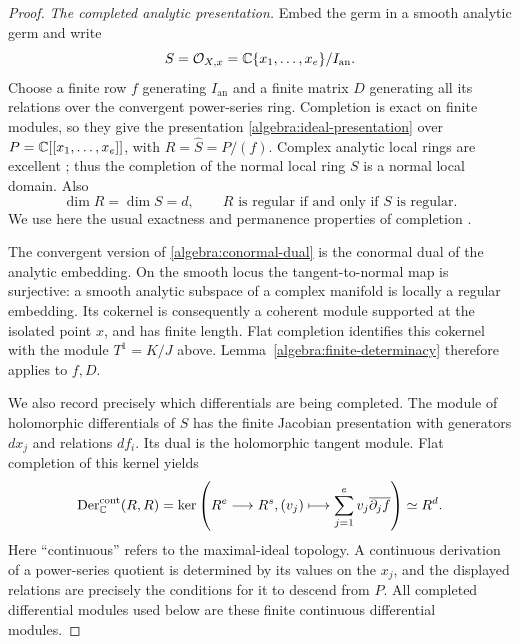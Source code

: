 \begin{proof}
\emph{The completed analytic presentation.}
Embed the germ in a smooth analytic germ and write
\[
 S=\mathcal O_{X,x}=\mathbb C\{x_1,\ldots,x_e\}/I_{\mathrm{an}}.
\]
Choose a finite row $f$ generating $I_{\mathrm{an}}$ and a finite matrix
$D$ generating all its relations over the convergent power-series ring.
Completion is exact on finite modules, so they give the presentation
\eqref{algebra:ideal-presentation} over $P=\mathbb C[[x_1,\ldots,x_e]]$,
with $R=\widehat S=P/(f)$.  Complex analytic local rings are excellent
\cite[Proposition~2.1(1)]{Cutkosky2017};
thus the completion of the normal local ring $S$ is a normal local
domain.  Also
\begin{equation}
\label{algebra:completion-invariants}
 \dim R=\dim S=d,
 \qquad R\text{ is regular if and only if }S\text{ is regular}.
\end{equation}
We use here the usual exactness and permanence properties of completion
\cite{StacksCompletion}.

The convergent version of \eqref{algebra:conormal-dual} is the conormal
dual of the analytic embedding.  On the smooth locus the tangent-to-normal
map is surjective: a smooth analytic subspace of a complex manifold is
locally a regular embedding.  Its cokernel is consequently a coherent
module supported at the isolated point $x$, and has finite length.
Flat completion identifies this cokernel with the module $T^1=K/J$
above.  Lemma~\ref{algebra:finite-determinacy} therefore applies to $f,D$.

We also record precisely which differentials are being completed.  The
module of holomorphic differentials of $S$ has the finite Jacobian
presentation with generators $dx_j$ and relations $df_i$.  Its dual is
the holomorphic tangent module.  Flat completion of this kernel yields
\begin{equation}
\label{algebra:continuous-tangent}
 \operatorname{Der}^{\mathrm{cont}}_{\mathbb C}(R,R)
 =\ker\left(R^e\longrightarrow R^s,
       (v_j)\longmapsto\sum_{j=1}^e v_j\overline{\partial_jf}\right)
 \simeq R^d.
\end{equation}
Here ``continuous'' refers to the maximal-ideal topology.  A continuous
derivation of a power-series quotient is determined by its values on
the $x_j$, and the displayed relations are precisely the conditions for
it to descend from $P$.  All completed differential modules used below
are these finite continuous differential modules.


\end{proof}
